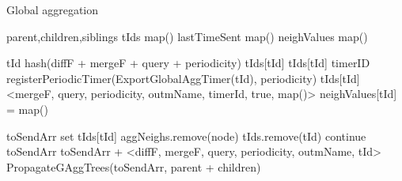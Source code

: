 \begin{algorithm}
    \caption{Global aggregation} \label{alg:mon:global_agg}
    \begin{algorithmic}[1]

    \asdstate \label{alg:mon:global_agg:state_start}
        \State parent,children,siblings 
        \State tIds \asdassign map()
        \State lastTimeSent \asdassign map()
        \State neighValues \asdassign map() \label{alg:mon:global_agg:state_end}
    \asdend

    \label{alg:mon:global_agg:start_req}
        \State tId \asdassign hash(diffF + mergeF + query + periodicity) 
            \State <diffF, mergeF, query, periodicity, outmName, timerId, isLocal, aggNeighs> \asdassign tIds[tId]
            \State tIds[tId] \asdassign <mergeF, query, periodicity, outmName, timerId, true, aggNeighs>
        \Else
            \State timerID \asdassign registerPeriodicTimer(ExportGlobalAggTimer(tId), periodicity)
            \State tIds[tId] \asdassign <mergeF, query, periodicity, outmName, timerId, true, map()>
            \State neighValues[tId] = map()
            \State
        \EndIf
    \asdend

     \label{alg:mon:global_agg:propag}
        \State toSendArr \asdassign set \label{alg:mon:global_agg:propag_start}
            \State <diffF, mergeF, query, periodicity, outmName, timerId, isLocal, aggNeighs> \asdassign tIds[tId]
                    \State aggNeighs.remove(node)
                \EndIf
            \EndFor
                \State tIds.remove(tId)
                \State continue
            \EndIf
                \State toSendArr \asdassign toSendArr + <diffF, mergeF, query, periodicity, outmName, tId>
            \EndIf
        \EndFor
        \State PropagateGAggTrees(toSendArr, parent + children) \label{alg:mon:global_agg:propag_end}
    \asdend


\end{algorithmic}
\end{algorithm}
